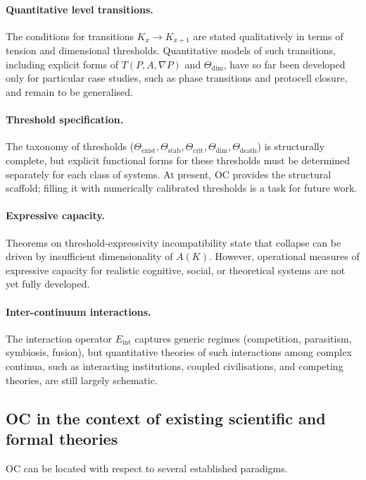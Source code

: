 \paragraph{Quantitative level transitions.}
The conditions for transitions \(K_x \to K_{x+1}\) are stated qualitatively in terms of tension and dimensional thresholds.
Quantitative models of such transitions, including explicit forms of \(T(P,A,\nabla P)\) and \(\Theta_{\mathrm{dim}}\), have so far been developed only for particular case studies, such as phase transitions and protocell closure, and remain to be generalised.

\paragraph{Threshold specification.}
The taxonomy of thresholds (\(\Theta_{\mathrm{exist}}, \Theta_{\mathrm{stab}}, \Theta_{\mathrm{crit}}, \Theta_{\mathrm{dim}}, \Theta_{\mathrm{death}}\)) is structurally complete,
but explicit functional forms for these thresholds must be determined separately for each class of systems.
At present, OC provides the structural scaffold; filling it with numerically calibrated thresholds is a task for future work.

\paragraph{Expressive capacity.}
Theorems on threshold-expressivity incompatibility state that collapse can be driven by insufficient dimensionality of \(A(K)\).
However, operational measures of expressive capacity for realistic cognitive,
social, or theoretical systems are not yet fully developed.

\paragraph{Inter-continuum interactions.}
The interaction operator \(E_{\mathrm{int}}\) captures generic regimes (competition, parasitism, symbiosis, fusion), but quantitative theories of such interactions among complex continua, such as interacting institutions, coupled civilisations, and competing theories, are still largely schematic.

\subsection{OC in the context of existing scientific and formal theories}

OC can be located with respect to several established paradigms.


